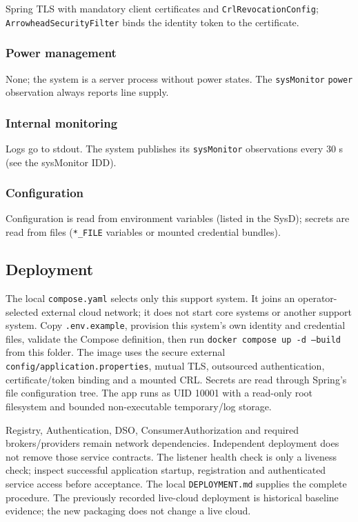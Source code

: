 \documentclass[a4paper]{arrowhead}
\begin{document}
Spring TLS with mandatory client certificates and \texttt{Crl\allowbreak{}Revocation\allowbreak{}Config}; \texttt{Arrowhead\allowbreak{}Security\allowbreak{}Filter} binds the identity token to the certificate.

\subsubsection{Power management}

None; the system is a server process without power states. The \texttt{sysMonitor} \texttt{power} observation always reports line supply.

\subsubsection{Internal monitoring}

Logs go to stdout. The system publishes its \texttt{sysMonitor} observations every 30 s (see the sysMonitor IDD).

\subsubsection{Configuration}

Configuration is read from environment variables (listed in the SysD); secrets are read from files (\texttt{*\_\allowbreak{}FILE} variables or mounted credential bundles).

\subsection{Deployment}

The local \texttt{compose.yaml} selects only this support system. It joins an operator-selected external cloud network; it does not start core systems or another support system. Copy \texttt{.env.example}, provision this system's own identity and credential files, validate the Compose definition, then run \texttt{docker compose up -d --build} from this folder. The image uses the secure external \texttt{config/application.properties}, mutual TLS, outsourced authentication, certificate/token binding and a mounted CRL. Secrets are read through Spring's file configuration tree. The app runs as UID 10001 with a read-only root filesystem and bounded non-executable temporary/log storage.

Registry, Authentication, DSO, ConsumerAuthorization and required brokers/providers remain network dependencies. Independent deployment does not remove those service contracts. The listener health check is only a liveness check; inspect successful application startup, registration and authenticated service access before acceptance. The local \texttt{DEPLOYMENT.md} supplies the complete procedure. The previously recorded live-cloud deployment is historical baseline evidence; the new packaging does not change a live cloud.
\end{document}
